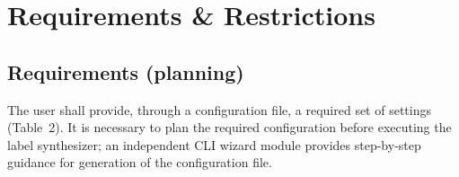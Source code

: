 \documentclass[a4paper,11pt]{article}
\begin{document}
\newpage

\section{\texorpdfstring{\quad Requirements \& Restrictions}{Requirements \& Restrictions}}
\subsection{\texorpdfstring{\quad Requirements}{Requirements} (planning)}
The user shall provide, through a configuration file, a required set of settings (Table~2). It is necessary to plan the required configuration before executing the label synthesizer; an independent CLI wizard module provides step-by-step guidance for generation of the configuration file.
\end{document}
